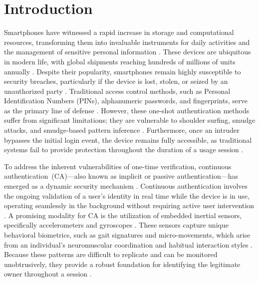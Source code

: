 \documentclass[3p,times,procedia]{elsarticle}
\begin{document}

\section{Introduction}
\label{sec:introduction}

Smartphones have witnessed a rapid increase in storage and
computational resources, transforming them into invaluable
instruments for daily activities and the management of sensitive
personal information \cite{abuhamad_autosen_2020}. These devices
are ubiquitous in modern life, with global shipments reaching
hundreds of millions of units annually \cite{alzubaidi_authentication_2016}.
Despite their popularity, smartphones remain highly susceptible
to security breaches, particularly if the device is lost,
stolen, or seized by an unauthorized party
\cite{abuhamad_autosen_2020}. Traditional access control methods,
such as Personal Identification Numbers (PINs), alphanumeric
passwords, and fingerprints, serve as the primary line of
defense \cite{clarke_authenticating_2007}. However, these one-shot
authentication methods suffer from significant limitations; they
are vulnerable to shoulder surfing, smudge attacks, and
smudge-based pattern inference \cite{zheng_you_2014}. Furthermore,
once an intruder bypasses the initial login event, the device
remains fully accessible, as traditional systems fail to provide
protection throughout the duration of a usage session
\cite{stylios_behavioral_2021}.

To address the inherent vulnerabilities of one-time
verification, continuous authentication~(CA)---also known as
implicit or passive authentication---has emerged as a dynamic
security mechanism \cite{abuhamad_autosen_2020}. Continuous
authentication involves the ongoing validation of a user's
identity in real time while the device is in use, operating
seamlessly in the background without requiring active user
intervention \cite{incel_dakota_2021}. A promising modality for CA is
the utilization of embedded inertial sensors, specifically
accelerometers and gyroscopes \cite{shen_performance_2018}. These sensors
capture unique behavioral biometrics, such as gait signatures
and micro-movements, which arise from an individual's
neuromuscular coordination and habitual interaction styles
\cite{alotaibi_hybrid_2025}. Because these patterns are difficult to
replicate and can be monitored unobtrusively, they provide a
robust foundation for identifying the legitimate owner
throughout a session \cite{sitova_hmog_2016}.
\end{document}
